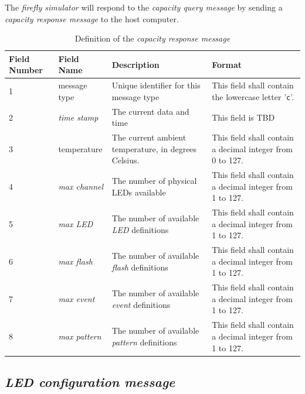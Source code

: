 \documentclass[letterpaper,11pt]{article}
\begin{document}
The \textit{firefly simulator} will respond to the \textit{capacity query
message} by sending a \textit{capacity response message} to the host computer.

\begin{table}[H]
  \caption{Definition of the \textit{capacity response message}}
  \centering
  \setlength\extrarowheight{2pt}
  \begin{tabular}[h]{|p{0.5in}|p{1.00in}|p{2.25in}|p{2.25in}|} \hline
    Field Number & Field Name & Description & Format \\ \hline
    1            & message type

    & Unique identifier for this message type
    & This field shall contain the lowercase letter '\texttt{c}'.
    \\ \hline
    2            & \textit{time stamp}
    & The current data and time
    & This field is TBD
    \\ \hline
    3            & temperature
    & The current ambient temperature, in degrees Celsius.
    & This field shall contain a decimal integer from 0 to 127.
    \\ \hline
    4            & \textit{max channel}
    & The number of physical LEDs available
    & This field shall contain a decimal integer from 1 to 127.
    \\ \hline
    5            & \textit{max LED}
    & The number of available \textit{LED} definitions
    & This field shall contain a decimal integer from 1 to 127.
    \\ \hline
    6            & \textit{max flash}
    & The number of available \textit{flash} definitions
    & This field shall contain a decimal integer from 1 to 127.
    \\ \hline
    7            & \textit{max event}
    & The number of available \textit{event} definitions
    & This field shall contain a decimal integer from 1 to 127.
    \\ \hline
    8            & \textit{max pattern}
    & The number of available \textit{pattern} definitions
    & This field shall contain a decimal integer from 1 to 127.
    \\ \hline
  \end{tabular}
  \label{tab:CapacityResponse}
\end{table}

\subsection{\textit{LED configuration message}}
\end{document}
